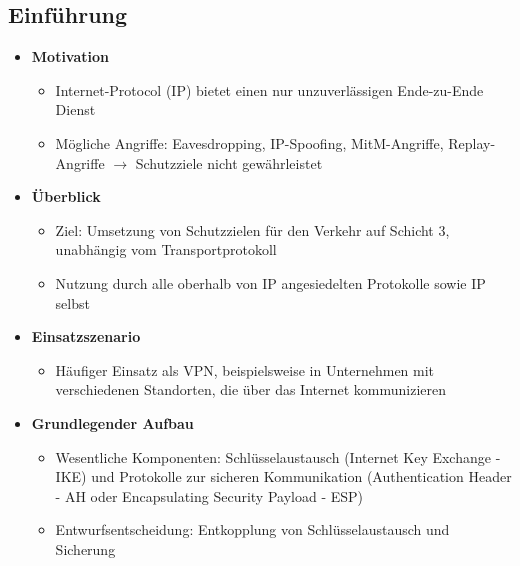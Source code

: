 \subsection{Einführung}
\begin{itemize}
	\item \textbf{Motivation}
	\begin{itemize}
		\item Internet-Protocol (IP) bietet einen nur unzuverlässigen Ende-zu-Ende Dienst
		\item Mögliche Angriffe: Eavesdropping, IP-Spoofing, MitM-Angriffe, Replay-Angriffe \(\rightarrow\) Schutzziele nicht gewährleistet
	\end{itemize}
	\item \textbf{Überblick}
	\begin{itemize}
		\item Ziel: Umsetzung von Schutzzielen für den Verkehr auf Schicht 3, unabhängig vom Transportprotokoll
		\item Nutzung durch alle oberhalb von IP angesiedelten Protokolle sowie IP selbst
	\end{itemize}
	\item \textbf{Einsatzszenario}
	\begin{itemize}
		\item Häufiger Einsatz als VPN, beispielsweise in Unternehmen mit verschiedenen Standorten, die über das Internet kommunizieren
	\end{itemize}
	\item \textbf{Grundlegender Aufbau}
	\begin{itemize}
		\item Wesentliche Komponenten: Schlüsselaustausch (Internet Key Exchange - IKE) und Protokolle zur sicheren Kommunikation (Authentication Header - AH oder Encapsulating Security Payload - ESP)
		\item Entwurfsentscheidung: Entkopplung von Schlüsselaustausch und Sicherung
	\end{itemize}
\end{itemize}


